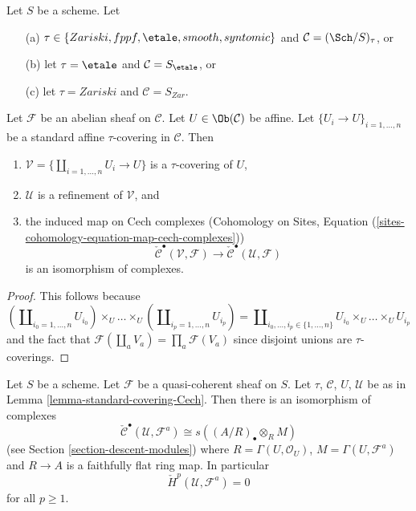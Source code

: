 \begin{lemma}
\label{lemma-standard-covering-Cech}
Let $S$ be a scheme. Let
\begin{enumerate}
\item[(a)] $\tau \in \{Zariski, \linebreak[0] fppf, \linebreak[0]
\etale, \linebreak[0] smooth, \linebreak[0] syntomic\}$
and $\mathcal{C} = (\Sch/S)_\tau$, or
\item[(b)] let $\tau = \etale$ and $\mathcal{C} = S_\etale$, or
\item[(c)] let $\tau = Zariski$ and $\mathcal{C} = S_{Zar}$.
\end{enumerate}
Let $\mathcal{F}$ be an abelian sheaf on $\mathcal{C}$.
Let $U \in \Ob(\mathcal{C})$ be affine.
Let $\{U_i \to U\}_{i = 1, \ldots, n}$ be a standard affine
$\tau$-covering in $\mathcal{C}$. Then
\begin{enumerate}
\item $\mathcal{V} = \{\coprod_{i = 1, \ldots, n} U_i \to U\}$ is a
$\tau$-covering of $U$,
\item $\mathcal{U}$ is a refinement of $\mathcal{V}$, and
\item the induced map on Cech complexes
(Cohomology on Sites,
Equation (\ref{sites-cohomology-equation-map-cech-complexes}))
$$
\check{\mathcal{C}}^\bullet(\mathcal{V}, \mathcal{F})
\longrightarrow
\check{\mathcal{C}}^\bullet(\mathcal{U}, \mathcal{F})
$$
is an isomorphism of complexes.
\end{enumerate}
\end{lemma}

\begin{proof}
This follows because
$$
(\coprod\nolimits_{i_0 = 1, \ldots, n} U_{i_0}) \times_U
\ldots \times_U
(\coprod\nolimits_{i_p = 1, \ldots, n} U_{i_p})
=
\coprod\nolimits_{i_0, \ldots, i_p \in \{1, \ldots, n\}}
U_{i_0} \times_U \ldots \times_U U_{i_p}
$$
and the fact that $\mathcal{F}(\coprod_a V_a) = \prod_a \mathcal{F}(V_a)$
since disjoint unions are $\tau$-coverings.
\end{proof}

\begin{lemma}
\label{lemma-standard-covering-Cech-quasi-coherent}
Let $S$ be a scheme. Let $\mathcal{F}$ be a quasi-coherent sheaf on $S$.
Let $\tau$, $\mathcal{C}$, $U$, $\mathcal{U}$ be as in
Lemma \ref{lemma-standard-covering-Cech}. Then there is an isomorphism
of complexes
$$
\check{\mathcal{C}}^\bullet(\mathcal{U}, \mathcal{F}^a)
\cong
s((A/R)_\bullet \otimes_R M)
$$
(see Section \ref{section-descent-modules})
where $R = \Gamma(U, \mathcal{O}_U)$, $M = \Gamma(U, \mathcal{F}^a)$
and $R \to A$ is a faithfully flat ring map. In particular
$$
\check{H}^p(\mathcal{U}, \mathcal{F}^a) = 0
$$
for all $p \geq 1$.
\end{lemma}


